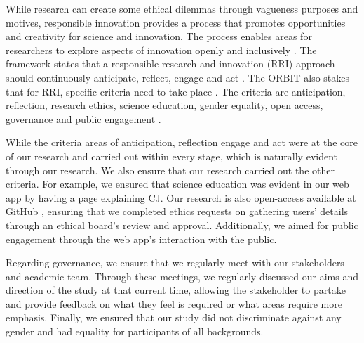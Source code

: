 	While research can create some ethical dilemmas through vagueness purposes and motives, responsible innovation provides a process that promotes opportunities and creativity for science and innovation. The process enables areas for researchers to explore aspects of innovation openly and inclusively \cite{ukri}. The framework states that a responsible research and innovation (RRI) approach should continuously anticipate, reflect, engage and act \cite{ukri_AREA}. The ORBIT also stakes that for RRI, specific criteria need to take place \cite{ukri_AREA}. The criteria are anticipation, reflection, research ethics, science education, gender equality, open access, governance and public engagement \cite{ORBIT}.
	
	While the criteria areas of anticipation, reflection engage and act were at the core of our research and carried out within every stage, which is naturally evident through our research. We also ensure that our research carried out the other criteria. For example, we ensured that science education was evident in our web app by having a page explaining CJ. Our research is also open-access available at GitHub \cite{GitHub}, ensuring that we completed ethics requests on gathering users' details through an ethical board's review and approval. Additionally, we aimed for public engagement through the web app's interaction with the public.
	
	Regarding governance, we ensure that we regularly meet with our stakeholders and academic team. Through these meetings, we regularly discussed our aims and direction of the study at that current time, allowing the stakeholder to partake and provide feedback on what they feel is required or what areas require more emphasis. Finally, we ensured that our study did not discriminate against any gender and had equality for participants of all backgrounds.
	
	
	
	
	
	